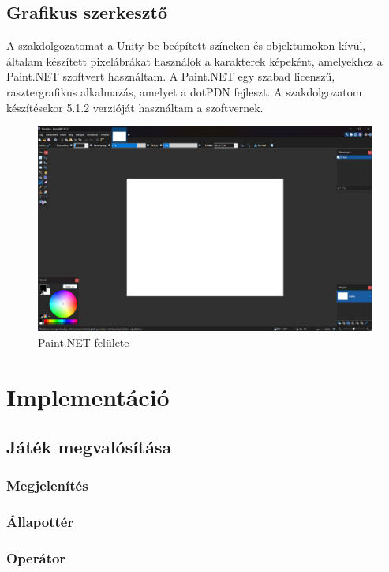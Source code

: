 \documentclass[
]{thesis-ekf}
\theoremstyle{definition}
\theoremstyle{remark}
\begin{document}
\section{Grafikus szerkesztő}

A szakdolgozatomat a Unity-be beépített színeken és objektumokon kívül, általam készített pixelábrákat használok a karakterek képeként, amelyekhez a Paint.NET szoftvert használtam. A Paint.NET egy szabad licenszű, rasztergrafikus alkalmazás, amelyet a dotPDN fejleszt. A szakdolgozatom készítésekor 5.1.2 verzióját használtam a szoftvernek.

\begin{figure}[h!]
	\centering
	\includegraphics[width=15cm]{./pictures/paint_net.png}
	\caption{Paint.NET felülete}
	\label{PaintNET}
\end{figure}

\chapter{Implementáció}

\section{Játék megvalósítása}

\subsection{Megjelenítés}

\subsection{Állapottér}

\subsection{Operátor}
\end{document}
